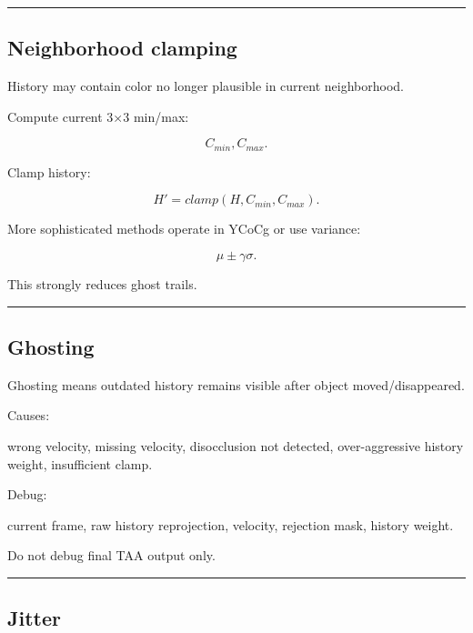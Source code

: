\begin{center}\rule{0.5\linewidth}{0.5pt}\end{center}

\subsection{Neighborhood clamping}\label{04-visual-computing-ii-ch040-neighborhood-clamping}

\hypertarget{04-visual-computing-ii-ch040-neighborhood-clamping}{}

History may contain color no longer plausible in current neighborhood.

Compute current 3×3 min/max:

\[
C_{min},C_{max}.
\]

Clamp history:

\[
\boxed{
H'
=
clamp(
H,
C_{min},
C_{max}
).
}
\]

More sophisticated methods operate in YCoCg or use variance:

\[
\mu\pm\gamma\sigma.
\]

This strongly reduces ghost trails.

\begin{center}\rule{0.5\linewidth}{0.5pt}\end{center}

\subsection{Ghosting}\label{04-visual-computing-ii-ch040-ghosting}

\hypertarget{04-visual-computing-ii-ch040-ghosting}{}

Ghosting means outdated history remains visible after object moved/disappeared.

Causes:

wrong velocity, missing velocity, disocclusion not detected, over-aggressive history weight, insufficient clamp.

Debug:

current frame, raw history reprojection, velocity, rejection mask, history weight.

Do not debug final TAA output only.

\begin{center}\rule{0.5\linewidth}{0.5pt}\end{center}

\subsection{Jitter}\label{04-visual-computing-ii-ch040-jitter}

